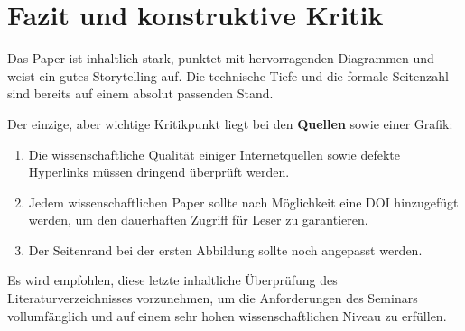 ﻿\documentclass[11pt, a4paper, ngerman]{article}
\begin{document}
\section{Fazit und konstruktive Kritik}
Das Paper ist inhaltlich stark, punktet mit hervorragenden Diagrammen und weist ein gutes Storytelling auf. Die technische Tiefe und die formale Seitenzahl sind bereits auf einem absolut passenden Stand. 

Der einzige, aber wichtige Kritikpunkt liegt bei den \textbf{Quellen} sowie einer Grafik:
\begin{enumerate}
    \item Die wissenschaftliche Qualität einiger Internetquellen sowie defekte Hyperlinks müssen dringend überprüft werden.
    \item Jedem wissenschaftlichen Paper sollte nach Möglichkeit eine DOI hinzugefügt werden, um den dauerhaften Zugriff für Leser zu garantieren.
    \item Der Seitenrand bei der ersten Abbildung sollte noch angepasst werden.
\end{enumerate}
Es wird empfohlen, diese letzte inhaltliche Überprüfung des Literaturverzeichnisses vorzunehmen, um die Anforderungen des Seminars vollumfänglich und auf einem sehr hohen wissenschaftlichen Niveau zu erfüllen.
\end{document}
